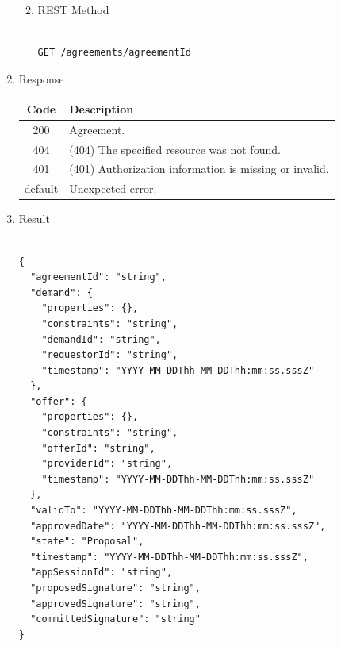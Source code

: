 \begin{enumerate}
\begin{enumerate}
\begin{table}[H]
\end{table}

\item REST Method

\begin{tcolorbox}[boxrule=0pt, frame empty]
\begin{verbatim} 

GET /agreements/agreementId

\end{verbatim}
\end{tcolorbox}

\end{enumerate}

\item Response

\begin{table}[H]
\footnotesize

\begin{center}
\begin{tabular}{|c|l|} 
\hline
\rowcolor{lightgray}	Code 		& 	Description \\
\hline
200	 		&	Agreement. \\
\hline
404			&	(404) The specified resource was not found. \\
\hline
401			&	(401) Authorization information is missing or invalid. \\
\hline
default		&	Unexpected error. \\
\hline
\end{tabular}
\end{center}

\end{table}

\item Result

\begin{tcolorbox}[boxrule=0pt, frame empty]
\begin{verbatim}

{
  "agreementId": "string",
  "demand": {
    "properties": {},
    "constraints": "string",
    "demandId": "string",
    "requestorId": "string",
    "timestamp": "YYYY-MM-DDThh-MM-DDThh:mm:ss.sssZ"
  },
  "offer": {
    "properties": {},
    "constraints": "string",
    "offerId": "string",
    "providerId": "string",
    "timestamp": "YYYY-MM-DDThh-MM-DDThh:mm:ss.sssZ"
  },
  "validTo": "YYYY-MM-DDThh-MM-DDThh:mm:ss.sssZ",
  "approvedDate": "YYYY-MM-DDThh-MM-DDThh:mm:ss.sssZ",
  "state": "Proposal",
  "timestamp": "YYYY-MM-DDThh-MM-DDThh:mm:ss.sssZ",
  "appSessionId": "string",
  "proposedSignature": "string",
  "approvedSignature": "string",
  "committedSignature": "string"
}


\end{verbatim}
\end{tcolorbox}
\end{enumerate}
